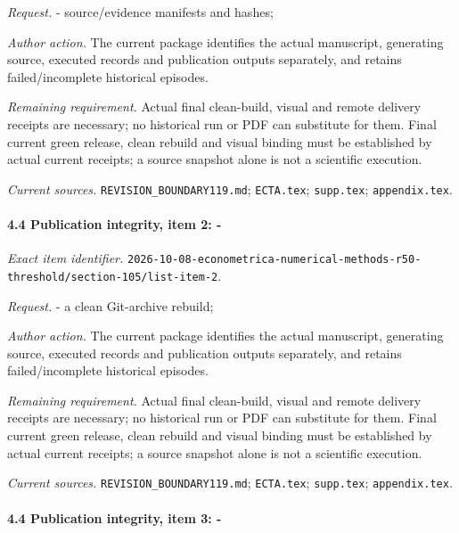 \par\emph{Request.} - source/\allowbreak{}evidence manifests and hashes;

\par\emph{Author action.} The current package identifies the actual manuscript, generating source, executed records and publication outputs separately, and retains failed/\allowbreak{}incomplete historical episodes.

\par\emph{Remaining requirement.} Actual final clean-build, visual and remote delivery receipts are necessary; no historical run or PDF can substitute for them. Final current green release, clean rebuild and visual binding must be established by actual current receipts; a source snapshot alone is not a scientific execution.

\par\emph{Current sources.} \nolinkurl{REVISION_BOUNDARY119.md}; \nolinkurl{ECTA.tex}; \nolinkurl{supp.tex}; \nolinkurl{appendix.tex}.

\paragraph{4.4 Publication integrity, item 2: -}

\emph{Exact item identifier.} \nolinkurl{2026-10-08-econometrica-numerical-methods-r50-threshold/section-105/list-item-2}.

\par\emph{Request.} - a clean Git-archive rebuild;

\par\emph{Author action.} The current package identifies the actual manuscript, generating source, executed records and publication outputs separately, and retains failed/\allowbreak{}incomplete historical episodes.

\par\emph{Remaining requirement.} Actual final clean-build, visual and remote delivery receipts are necessary; no historical run or PDF can substitute for them. Final current green release, clean rebuild and visual binding must be established by actual current receipts; a source snapshot alone is not a scientific execution.

\par\emph{Current sources.} \nolinkurl{REVISION_BOUNDARY119.md}; \nolinkurl{ECTA.tex}; \nolinkurl{supp.tex}; \nolinkurl{appendix.tex}.

\paragraph{4.4 Publication integrity, item 3: -}

